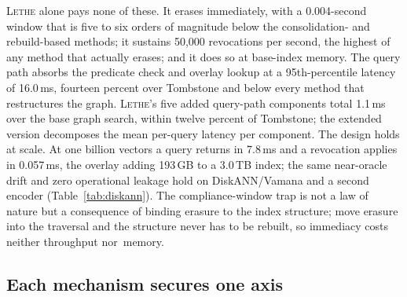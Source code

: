 \documentclass[sigconf, nonacm, review]{acmart}
\newif\ifextended\extendedtrue %
\begin{document}
\textsc{Lethe} alone pays none of these. It erases immediately, with a
0.004-second window that is five to six orders of magnitude below the
consolidation- and rebuild-based methods; it sustains 50{,}000 revocations
per second, the highest of any method that actually erases; and it does so at
base-index memory. The query path absorbs the predicate check and overlay
lookup at a 95th-percentile latency of 16.0\,ms, fourteen percent over
Tombstone and below every method that restructures the graph.
\textsc{Lethe}'s five added query-path components total 1.1\,ms over the base
graph search, within twelve percent of Tombstone; the extended version
decomposes the mean per-query latency per component. The design
holds at scale. At one billion vectors a query returns in 7.8\,ms and a
revocation applies in 0.057\,ms, the overlay adding 193\,GB to a 3.0\,TB
index; the same near-oracle drift and zero operational leakage hold on
DiskANN/Vamana and a second encoder
\ifextended (Table~\ref{tab:diskann})\else (extended version)\fi. The compliance-window
trap is not a law of nature but a consequence of binding erasure to the index
structure; move erasure into the traversal and the structure never has to be
rebuilt, so immediacy costs neither throughput nor~memory.

\subsection{Each mechanism secures one axis}
\label{sec:eval-ablation}
\end{document}
